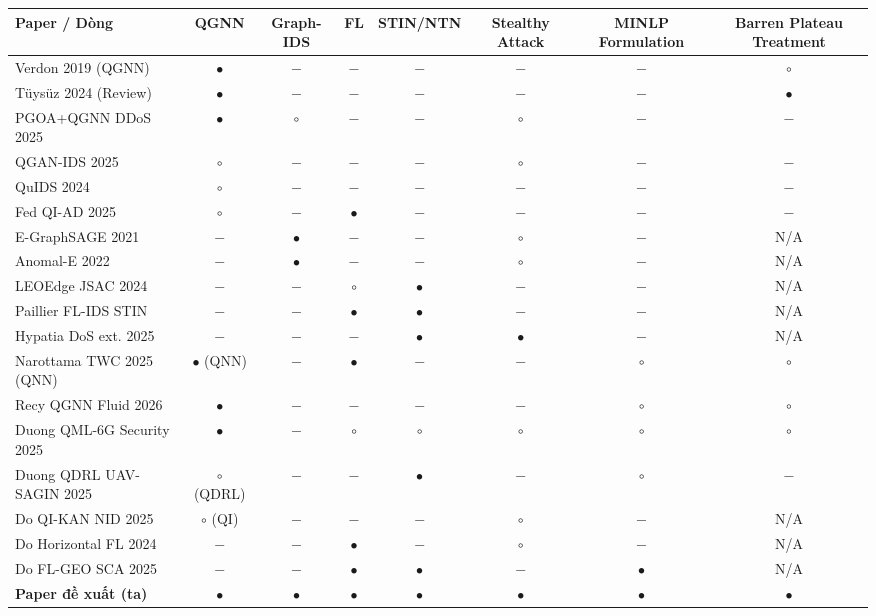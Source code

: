 \documentclass[11pt,a4paper]{article}
\begin{document}
\begin{longtable}{@{}p{4.8cm} c c c c c c c@{}}
\toprule
\textbf{Paper / Dòng} & \textbf{QGNN} & \textbf{Graph-IDS} & \textbf{FL} & \textbf{STIN/NTN} & \textbf{Stealthy Attack} & \textbf{MINLP Formulation} & \textbf{Barren Plateau Treatment} \\
\midrule
\endhead
Verdon 2019 (QGNN) & $\bullet$ & $-$ & $-$ & $-$ & $-$ & $-$ & $\circ$ \\
Tüysüz 2024 (Review) & $\bullet$ & $-$ & $-$ & $-$ & $-$ & $-$ & $\bullet$ \\
PGOA+QGNN DDoS 2025 & $\bullet$ & $\circ$ & $-$ & $-$ & $\circ$ & $-$ & $-$ \\
QGAN-IDS 2025 & $\circ$ & $-$ & $-$ & $-$ & $\circ$ & $-$ & $-$ \\
QuIDS 2024 & $\circ$ & $-$ & $-$ & $-$ & $-$ & $-$ & $-$ \\
Fed QI-AD 2025 & $\circ$ & $-$ & $\bullet$ & $-$ & $-$ & $-$ & $-$ \\
E-GraphSAGE 2021 & $-$ & $\bullet$ & $-$ & $-$ & $\circ$ & $-$ & N/A \\
Anomal-E 2022 & $-$ & $\bullet$ & $-$ & $-$ & $\circ$ & $-$ & N/A \\
LEOEdge JSAC 2024 & $-$ & $-$ & $\circ$ & $\bullet$ & $-$ & $-$ & N/A \\
Paillier FL-IDS STIN & $-$ & $-$ & $\bullet$ & $\bullet$ & $-$ & $-$ & N/A \\
Hypatia DoS ext. 2025 & $-$ & $-$ & $-$ & $\bullet$ & $\bullet$ & $-$ & N/A \\
Narottama TWC 2025 (QNN) & $\bullet$ (QNN) & $-$ & $\bullet$ & $-$ & $-$ & $\circ$ & $\circ$ \\
Recy QGNN Fluid 2026 & $\bullet$ & $-$ & $-$ & $-$ & $-$ & $\circ$ & $\circ$ \\
Duong QML-6G Security 2025 & $\bullet$ & $-$ & $\circ$ & $\circ$ & $\circ$ & $\circ$ & $\circ$ \\
Duong QDRL UAV-SAGIN 2025 & $\circ$ (QDRL) & $-$ & $-$ & $\bullet$ & $-$ & $\circ$ & $-$ \\
Do QI-KAN NID 2025 & $\circ$ (QI) & $-$ & $-$ & $-$ & $\circ$ & $-$ & N/A \\
Do Horizontal FL 2024 & $-$ & $-$ & $\bullet$ & $-$ & $\circ$ & $-$ & N/A \\
Do FL-GEO SCA 2025 & $-$ & $-$ & $\bullet$ & $\bullet$ & $-$ & $\bullet$ & N/A \\
\midrule
\textbf{\color{accent} Paper đề xuất (ta)} & $\bullet$ & $\bullet$ & $\bullet$ & $\bullet$ & $\bullet$ & $\bullet$ & $\bullet$ \\
\bottomrule
\end{longtable}
\end{document}

